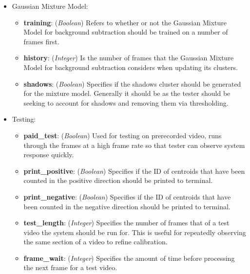 \begin{itemize}
\item Gaussian Mixture Model:
    \begin{itemize}
        \item \textbf{training}: (\emph{Boolean}) Refers to whether or not the Gaussian Mixture Model for background subtraction should be trained on a number of frames first.
        \item \textbf{history}: (\emph{Integer}) Is the number of frames that the Gaussian Mixture Model for background subtraction considers when updating its clusters.
        \item\textbf{shadows}: (\emph{Boolean}) Specifies if the shadows cluster should be generated for the mixture model. Generally it should be as the tester should be seeking to account for shadows and removing them via thresholding.
    \end{itemize}

\item Testing: 
    \begin{itemize}
        \item \textbf{paid\_test}: (\emph{Boolean}) Used for testing on prerecorded video, runs through the frames at a high frame rate so that tester can observe system response quickly.
        \item \textbf{print\_positive}: (\emph{Boolean}) Specifies if the ID of centroids that have been counted in the positive direction should be printed to terminal.
        \item \textbf{print\_negative}: (\emph{Boolean}) Specifies if the ID of centroids that have been counted in the negative direction should be printed to terminal.
        \item \textbf{test\_length}: (\emph{Integer}) Specifies the number of frames that of a test video the system should be run for. This is useful for repeatedly observing the same section of a video to refine calibration.
        \item\textbf{frame\_wait}: (\emph{Integer}) Specifies the amount of time before processing the next frame for a test video. 
    \end{itemize}


\end{itemize}
